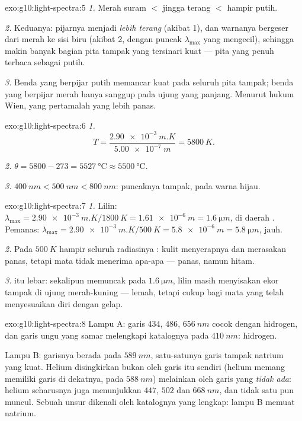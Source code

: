 \begin{solution}{exo:g10:light-spectra:5}
\emph{1.} Merah suram $<$ jingga terang $<$ hampir putih.

\emph{2.} Keduanya: pijarnya menjadi \emph{lebih terang} (akibat 1), dan
warnanya bergeser dari merah ke sisi biru (akibat 2, dengan puncak
$\lambda_{\max}$ yang mengecil), sehingga makin banyak bagian pita
tampak yang tersinari kuat --- pita yang penuh terbaca sebagai putih.

\emph{3.} Benda yang berpijar putih memancar kuat pada seluruh pita
tampak; benda yang berpijar merah hanya sanggup pada ujung  yang panjang. Menurut hukum Wien, yang pertamalah yang lebih
panas.
\end{solution}

\begin{solution}{exo:g10:light-spectra:6}
\emph{1.}
\[
T = \frac{\qty{2.90e-3}{m.K}}{\qty{5.00e-7}{m}} = \qty{5800}{K}.
\]

\emph{2.} $\theta = 5800 - 273 = \qty{5527}{\degreeCelsius} \approx
\qty{5500}{\degreeCelsius}$.

\emph{3.} $\qty{400}{nm} < \qty{500}{nm} < \qty{800}{nm}$: puncaknya
tampak, pada warna hijau.
\end{solution}

\begin{solution}{exo:g10:light-spectra:7}
\emph{1.} Lilin:
$\lambda_{\max} = \qty{2.90e-3}{m.K} / \qty{1800}{K} = \qty{1.61e-6}{m}
= \qty{1.6}{\micro m}$, di daerah . Pemanas:
$\lambda_{\max} = \qty{2.90e-3}{m.K} / \qty{500}{K} = \qty{5.8e-6}{m}
= \qty{5.8}{\micro m}$,  jauh.

\emph{2.} Pada $\qty{500}{K}$ hampir seluruh radiasinya :
kulit menyerapnya dan merasakan panas, tetapi mata tidak menerima
apa-apa --- panas, namun hitam.

\emph{3.}  itu lebar: sekalipun memuncak pada
$\qty{1.6}{\micro m}$,  lilin masih menyisakan ekor tampak di
ujung merah-kuning --- lemah, tetapi cukup bagi mata yang telah
menyesuaikan diri dengan gelap.
\end{solution}

\begin{solution}{exo:g10:light-spectra:8}
Lampu A: garis $434$, $486$, $\qty{656}{nm}$ cocok dengan hidrogen, dan
garis ungu yang samar melengkapi katalognya pada $\qty{410}{nm}$:
hidrogen.

Lampu B: garisnya berada pada $\qty{589}{nm}$, satu-satunya garis
tampak natrium yang kuat. Helium disingkirkan bukan oleh garis itu
sendiri (helium memang memiliki garis di dekatnya, pada
$\qty{588}{nm}$) melainkan oleh garis yang \emph{tidak ada}: helium
seharusnya juga menunjukkan $447$, $502$ dan $\qty{668}{nm}$, dan tidak
satu pun muncul. Sebuah unsur dikenali oleh katalognya yang lengkap:
lampu B memuat natrium.
\end{solution}

